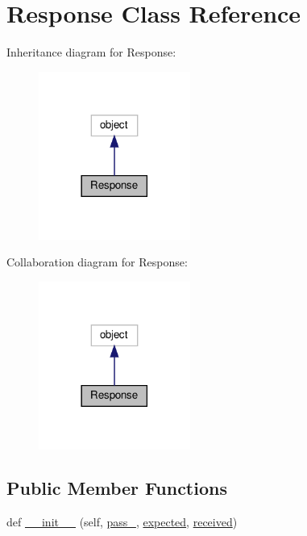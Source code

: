 \hypertarget{classpewpewlaz0rt4nk_1_1_response}{}\section{Response Class Reference}
\label{classpewpewlaz0rt4nk_1_1_response}


Inheritance diagram for Response\+:
\nopagebreak
\begin{figure}[H]
\begin{center}
\leavevmode
\includegraphics[width=141pt]{classpewpewlaz0rt4nk_1_1_response__inherit__graph}
\end{center}
\end{figure}


Collaboration diagram for Response\+:
\nopagebreak
\begin{figure}[H]
\begin{center}
\leavevmode
\includegraphics[width=141pt]{classpewpewlaz0rt4nk_1_1_response__coll__graph}
\end{center}
\end{figure}
\subsection*{Public Member Functions}
\begin{DoxyCompactItemize}
\item 
def \hyperlink{classpewpewlaz0rt4nk_1_1_response_aba15f6a5c8c7934fc61604b13ebb85a8}{\+\_\+\+\_\+init\+\_\+\+\_\+} (self, \hyperlink{classpewpewlaz0rt4nk_1_1_response_a40c180ffecdf131ba12f6a09349a1033}{pass\+\_\+}, \hyperlink{classpewpewlaz0rt4nk_1_1_response_aa6e67bddae371a5731f6d4002e787299}{expected}, \hyperlink{classpewpewlaz0rt4nk_1_1_response_a082fd9f55493d749cafc1e11ad84a2b6}{received})
\end{DoxyCompactItemize}
